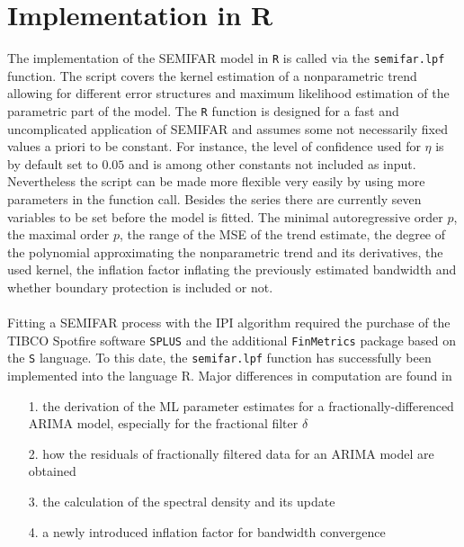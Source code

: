 \documentclass[12pt]{article}
\newcommand{\code}[1]{\texttt{#1}}
\begin{document}
\section{Implementation in R}
The implementation of the SEMIFAR model in \code{R} is called via the \code{semifar.lpf} function. 
The script covers the kernel estimation of a nonparametric trend allowing for different error structures and maximum likelihood estimation of the parametric part of the model. The \code{R} function is designed for a fast and uncomplicated application of SEMIFAR and assumes some not necessarily fixed values a priori to be constant. For instance, the level of confidence used for \( \eta \) is by default set to \(0.05\) and is among other constants not included as input. Nevertheless the script can be made more flexible very easily by using more parameters in the function call. 
Besides the series there are currently seven variables to be set before the model is fitted.
The minimal autoregressive order \(p\), the maximal order \(p\), the range of the MSE of the trend estimate, the degree of the polynomial approximating the nonparametric trend and its derivatives, the used kernel, the inflation factor inflating the previously estimated bandwidth and whether boundary protection is included or not. \\
\\
Fitting a SEMIFAR process with the IPI algorithm required the purchase of the TIBCO Spotfire software \code{SPLUS} and the additional \code{FinMetrics} package based on the \code{S} language. To this date, the \code{semifar.lpf} function has successfully been implemented into the language R.
Major differences in computation are found in 
\begin{enumerate}
	\item[1.] the derivation of the ML parameter estimates for a fractionally-differenced ARIMA model, especially for the fractional filter \( \delta \)
	\item[2.] how the residuals of fractionally filtered data for an ARIMA model are obtained 
	\item[3.] the calculation of the spectral density and its update
	\item[4.] a newly introduced inflation factor for bandwidth convergence  
\end{enumerate}
\end{document}
